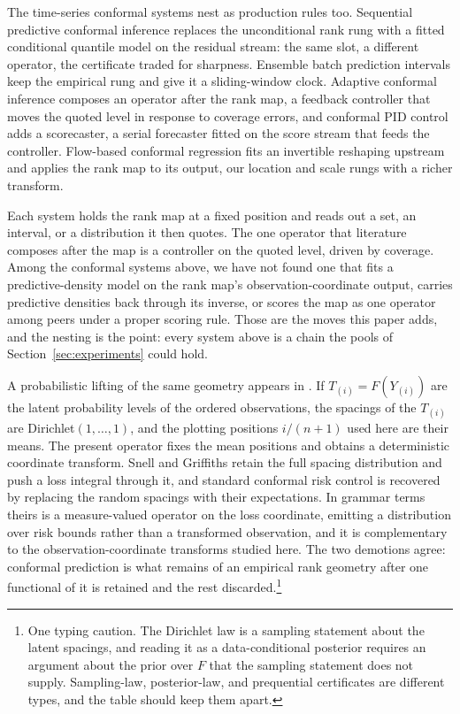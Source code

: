 \documentclass[11pt]{article}
\theoremstyle{remark}
\begin{document}
The time-series conformal systems nest as production rules too. Sequential predictive
conformal inference \citep{xu2023spci} replaces the unconditional rank rung with a
fitted conditional quantile model on the residual stream: the same slot, a different
operator, the certificate traded for sharpness. Ensemble batch prediction intervals
\citep{xu2021enbpi} keep the empirical rung and give it a sliding-window clock.
Adaptive conformal inference \citep{gibbs2021adaptive} composes an operator after the
rank map, a feedback controller that moves the quoted level in response to coverage
errors, and conformal PID control \citep{angelopoulos2023pid} adds a scorecaster, a
serial forecaster fitted on the score stream that feeds the controller. Flow-based
conformal regression \citep{colombo2024flows} fits an invertible reshaping upstream
and applies the rank map to its output, our location and scale rungs with a richer
transform.

Each system holds the rank map at a
fixed position and reads out a set, an interval, or a distribution it then quotes. The
one operator that literature composes after the map is a controller on the quoted
level, driven by coverage. Among the conformal systems above, we have not found one
that fits a predictive-density model on the rank map's observation-coordinate output,
carries predictive densities back through its inverse, or scores the map as one
operator among peers under a proper scoring rule. Those are the moves this paper adds, and the
nesting is the point: every system above is a chain the pools of
Section~\ref{sec:experiments} could hold.

A probabilistic lifting of the same geometry appears in
\citet{snell2025quadrature}. If $T_{(i)} = F(Y_{(i)})$ are the latent probability
levels of the ordered observations, the spacings of the $T_{(i)}$ are
Dirichlet$(1, \dots, 1)$, and the plotting positions $i/(n+1)$ used here are their
means. The present operator fixes the mean positions and obtains a deterministic
coordinate transform. Snell and Griffiths retain the full spacing distribution and push
a loss integral through it, and standard conformal risk control is recovered by
replacing the random spacings with their expectations. In grammar terms theirs is a
measure-valued operator on the loss coordinate, emitting a distribution over risk
bounds rather than a transformed observation, and it is complementary to the
observation-coordinate transforms studied here. The two demotions agree: conformal
prediction is what remains of an empirical rank geometry after one functional of it is
retained and the rest discarded.\footnote{One typing caution. The Dirichlet law is a
sampling statement about the latent spacings, and reading it as a data-conditional
posterior requires an argument about the prior over $F$ that the sampling statement
does not supply. Sampling-law, posterior-law, and prequential certificates are
different types, and the table should keep them apart.}
\end{document}
